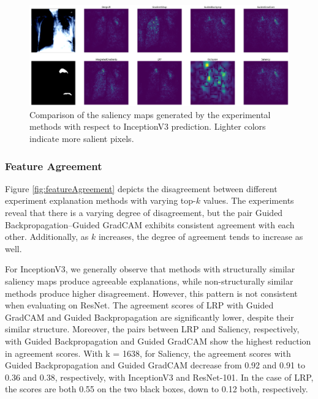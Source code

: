 \begin{figure}[t]
    \centering
    \includegraphics[width=\textwidth]{images/results/shape-comparison-inceptionv3.png}
    \caption{Comparison of the saliency maps generated by the experimental methods with respect to InceptionV3 prediction. Lighter colors indicate more salient pixels.}
    \label{fig:shapeComparison}
\end{figure}

\subsubsection{Feature Agreement}
\label{subsec:featureAgreement}
Figure \ref{fig:featureAgreement} depicts the disagreement between different experiment explanation methods with varying top-$k$ values. The experiments reveal that there is a varying degree of disagreement, but the pair Guided Backpropagation--Guided GradCAM exhibits consistent agreement with each other. Additionally, as $k$ increases, the degree of agreement tends to increase as well.

For InceptionV3, we generally observe that methods with structurally similar saliency maps produce agreeable explanations, while non-structurally similar methods produce higher disagreement. However, this pattern is not consistent when evaluating on ResNet. The agreement scores of LRP with Guided GradCAM and Guided Backpropagation are significantly lower, despite their similar structure. Moreover, the pairs between LRP and Saliency, respectively, with Guided Backpropagation and Guided GradCAM show the highest reduction in agreement scores. With k = 1638, for Saliency, the agreement scores with Guided Backpropagation and Guided GradCAM decrease from 0.92 and 0.91 to 0.36 and 0.38, respectively, with InceptionV3 and ResNet-101. In the case of LRP, the scores are both 0.55 on the two black boxes, down to 0.12 both, respectively.

